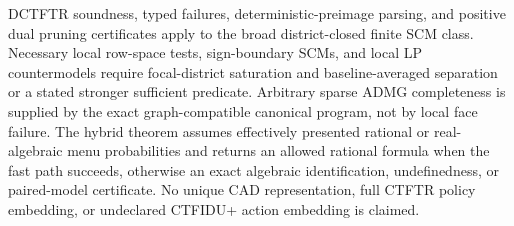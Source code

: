 DCTFTR soundness, typed failures, deterministic-preimage parsing, and positive dual pruning certificates apply to the broad district-closed finite SCM class.  Necessary local row-space tests, sign-boundary SCMs, and local LP countermodels require focal-district saturation and baseline-averaged separation or a stated stronger sufficient predicate.  Arbitrary sparse ADMG completeness is supplied by the exact graph-compatible canonical program, not by local face failure.  The hybrid theorem assumes effectively presented rational or real-algebraic menu probabilities and returns an allowed rational formula when the fast path succeeds, otherwise an exact algebraic identification, undefinedness, or paired-model certificate.  No unique CAD representation, full CTFTR policy embedding, or undeclared CTFIDU+ action embedding is claimed.